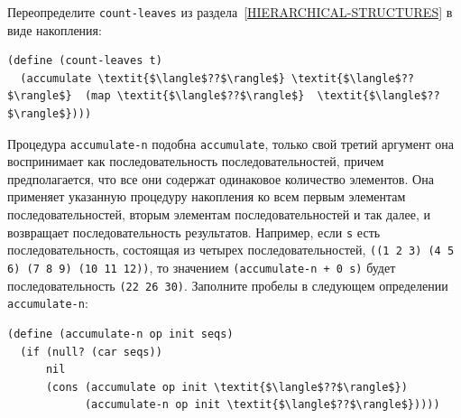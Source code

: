 \begin{exercise}{2.35}\label{EX2.35}%
Переопределите {\tt count-leaves} из 
раздела~\ref{HIERARCHICAL-STRUCTURES} в виде
накопления: 

\begin{Verbatim}[fontsize=\small]
(define (count-leaves t)
  (accumulate \textit{$\langle$??$\rangle$} \textit{$\langle$??$\rangle$}  (map \textit{$\langle$??$\rangle$}  \textit{$\langle$??$\rangle$})))
\end{Verbatim}
\end{exercise}
\begin{exercise}{2.36}\label{EX2.36}%
Процедура {\tt accumulate-n} подобна
{\tt accumulate}, только свой третий аргумент она воспринимает
как последовательность последовательностей, причем предполагается, что 
все они содержат одинаковое количество элементов. Она применяет
указанную процедуру накопления ко всем первым элементам
последовательностей, вторым элементам последовательностей и так далее, 
и возвращает последовательность результатов.  Например, если
{\tt s} есть последовательность, состоящая из четырех
последовательностей, {\tt ((1 2 3) (4 5 6) (7 8 9) (10 11
12))}, то значением {\tt (accumulate-n + 0 s)} будет
последовательность {\tt (22 26 30)}.  Заполните пробелы в
следующем определении {\tt accumulate-n}:

\begin{Verbatim}[fontsize=\small]
(define (accumulate-n op init seqs)
  (if (null? (car seqs))
      nil
      (cons (accumulate op init \textit{$\langle$??$\rangle$})
            (accumulate-n op init \textit{$\langle$??$\rangle$}))))
\end{Verbatim}
\end{exercise}
